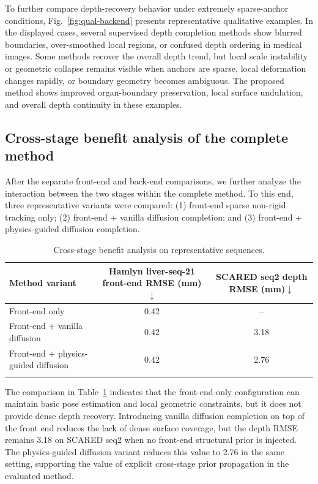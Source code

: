 \documentclass[pdflatex,sn-mathphys-num]{sn-jnl}
\begin{document}
To further compare depth-recovery behavior under extremely sparse-anchor conditions, Fig.~\ref{fig:qual-backend} presents representative qualitative examples. In the displayed cases, several supervised depth completion methods show blurred boundaries, over-smoothed local regions, or confused depth ordering in medical images. Some methods recover the overall depth trend, but local scale instability or geometric collapse remains visible when anchors are sparse, local deformation changes rapidly, or boundary geometry becomes ambiguous. The proposed method shows improved organ-boundary preservation, local surface undulation, and overall depth continuity in these examples.


\subsection{Cross-stage benefit analysis of the complete method}\label{subsec:system}

After the separate front-end and back-end comparisons, we further analyze the interaction between the two stages within the complete method. To this end, three representative variants were compared: (1) front-end sparse non-rigid tracking only; (2) front-end + vanilla diffusion completion; and (3) front-end + physics-guided diffusion completion.

\begin{table}[t]
\caption{Cross-stage benefit analysis on representative sequences.}
\label{tab:system}
\centering
\small
\begin{tabular}{p{}cc}
\toprule
Method variant & \makecell{Hamlyn liver-seq-21\\front-end RMSE (mm)$\downarrow$} & \makecell{SCARED seq2\\depth RMSE (mm)$\downarrow$} \\
\midrule
Front-end only & 0.42 & -- \\
Front-end + vanilla diffusion & 0.42 & 3.18 \\
Front-end + physics-guided diffusion & 0.42 & 2.76 \\
\botrule
\end{tabular}
\end{table}

The comparison in Table~\ref{tab:system} indicates that the front-end-only configuration can maintain basic pose estimation and local geometric constraints, but it does not provide dense depth recovery. Introducing vanilla diffusion completion on top of the front end reduces the lack of dense surface coverage, but the depth RMSE remains 3.18 on SCARED seq2 when no front-end structural prior is injected. The physics-guided diffusion variant reduces this value to 2.76 in the same setting, supporting the value of explicit cross-stage prior propagation in the evaluated method.
\end{document}

